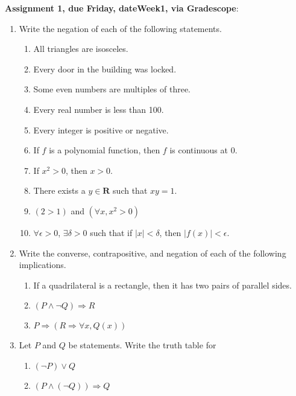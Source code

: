 \documentclass[12pt]{article}
\begin{document}
\noindent \textbf{Assignment 1, due Friday, \csname dateWeek1\endcsname, via Gradescope}:
\begin{enumerate}

\item Write the negation of each of the following statements.

 \begin{enumerate}
\item All triangles are isosceles.
\item Every door in the building was locked.
\item Some even numbers are multiples of three.
\item Every real number is less than 100.
\item Every integer is positive or negative.
\item If $f$ is a polynomial function, then $f$ is continuous at $0$.
\item If $x^2 > 0$, then $x > 0$.
\item There exists a $y \in \mathbf{R}$ such that $xy = 1$.
\item $(2 > 1)$ and $(\forall x, x^2 > 0)$
\item $\forall \epsilon > 0$, $\exists \delta > 0$ such that if $|x| < \delta$, then $|f(x)| < \epsilon$.
\end{enumerate}

\item Write the converse, contrapositive, and negation of each of the following implications.

 \begin{enumerate}
\item If a quadrilateral is a rectangle, then it has two pairs of parallel sides.
\item $(P \wedge \neg Q) \Rightarrow R$
\item $P  \Rightarrow (R \Rightarrow \forall x, Q(x))$
\end{enumerate}

\item Let $P$ and $Q$ be statements. Write the truth table for
  \begin{enumerate}
  \item $(\neg P) \vee Q$
  \item $(P \wedge (\neg Q)) \Rightarrow Q$
  \end{enumerate}


\end{enumerate}
\end{document}
